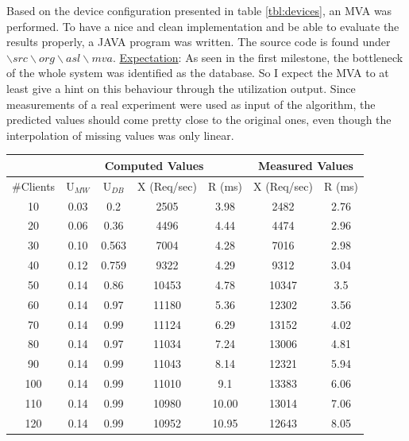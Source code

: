 \documentclass[11pt]{article}
\begin{document}
Based on the device configuration presented in table \ref{tbl:devices}, an MVA was performed. To have a nice and clean implementation and be able to evaluate the results properly, a JAVA program was written. The source code is found under $\backslash src\backslash org\backslash asl\backslash mva$.
\newline\underline{Expectation}: As seen in the first milestone, the bottleneck of the whole system was identified as the database. So I expect the MVA to at least give a hint on this behaviour through the utilization output. Since measurements of a real experiment were used as input of the algorithm, the predicted values should come pretty close to the original ones, even though the interpolation of missing values was only linear. 

\begin{center}
	\begin{tabular}{c|c|c|c|c||c|c}
		\hline
		& \multicolumn{4}{c||}{Computed Values} & \multicolumn{2}{c}{Measured Values} \\
		\hline
		\#Clients & U$_{MW}$ & U$_{DB}$ & X (Req/sec) & R (ms) & X (Req/sec) & R (ms) \\
		\hline
		10 & 0.03 & 0.2 & 2505 & 3.98 & 2482 & 2.76 \\
		20 & 0.06 & 0.36 & 4496 & 4.44 & 4474 & 2.96 \\
		30 & 0.10 & 0.563 & 7004 & 4.28 & 7016 & 2.98 \\
		40 & 0.12 & 0.759 & 9322 & 4.29 & 9312 & 3.04 \\
		50 & 0.14 & 0.86 & 10453 & 4.78 & 10347 & 3.5 \\
		60 & 0.14 & 0.97 & 11180 & 5.36 & 12302 & 3.56 \\
		70 & 0.14 & 0.99 & 11124 & 6.29 & 13152& 4.02 \\
		80 & 0.14 & 0.97 & 11034 & 7.24 & 13006 & 4.81 \\
		90 & 0.14 & 0.99 & 11043 & 8.14 & 12321 & 5.94 \\
		100 & 0.14 & 0.99 & 11010 & 9.1 & 13383 & 6.06 \\
		110 & 0.14 & 0.99 & 10980 & 10.00 & 13014 & 7.06 \\
		120 & 0.14 & 0.99 & 10952 & 10.95 & 12643 & 8.05 \\
		\hline		
	\end{tabular}
	\label{tbl:mva}
\end{center}
\end{document}
